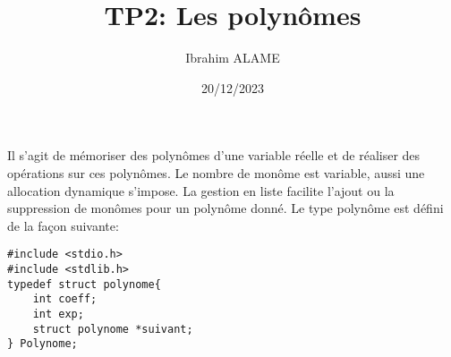 \documentclass[a4paper]{article}
\title{TP2: Les polynômes}
\author{Ibrahim ALAME}
\date{20/12/2023}
\begin{document}
\maketitle

%

Il s'agit de mémoriser des polynômes d'une variable réelle et de réaliser des opérations sur ces polynômes. Le nombre de monôme est variable, aussi une allocation dynamique s'impose. La gestion en liste facilite l'ajout ou la suppression de monômes pour un polynôme donné. Le type polynôme est défini de la façon suivante:

\begin{verbatim}
#include <stdio.h>
#include <stdlib.h>
typedef struct polynome{
    int coeff;
    int exp;
    struct polynome *suivant;
} Polynome;    
\end{verbatim}
\end{document}
